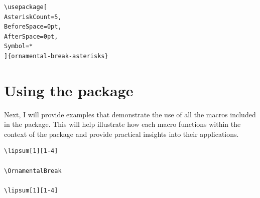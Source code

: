 \documentclass[a4paper,10pt]{article}
\begin{document}
\begin{mdframed}[backgroundcolor=black!10,rightline=false,leftline=false]
\begin{verbatim}
\usepackage[
AsteriskCount=5,
BeforeSpace=0pt,
AfterSpace=0pt,
Symbol=*
]{ornamental-break-asterisks}
\end{verbatim}
\end{mdframed}



\section{Using the package}
Next, I will provide examples that demonstrate the use of all the macros included in the package. 
This will help illustrate how each macro functions within the context of the package and provide 
practical insights into their applications.


\begin{verbatim}
\lipsum[1][1-4]

\OrnamentalBreak

\lipsum[1][1-4]
\end{verbatim}

\lipsum[1][1-4]

\OrnamentalBreak

\lipsum[1][1-4]
\end{document}
